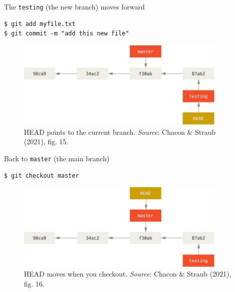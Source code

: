 \documentclass[handout]{beamer}
\begin{document}
\begin{frame}[fragile]{The \texttt{testing} (the new branch) moves forward}

\begin{lstlisting}
$ git add myfile.txt
$ git commit -m "add this new file"
\end{lstlisting}

\begin{figure}
	\includegraphics[width=0.9\textwidth]{figures/fig15_testing_forward.png}
	\caption{HEAD points to the current branch. \textit{Source}: Chacon \& Straub (2021), fig. 15.}
\end{figure}
\end{frame}


\begin{frame}[fragile]{Back to \texttt{master} (the main branch)}

\begin{lstlisting}
$ git checkout master
\end{lstlisting}

\begin{figure}
	\includegraphics[width=0.9\textwidth]{figures/fig16_back_to_master.png}
	\caption{HEAD moves when you checkout. \textit{Source}: Chacon \& Straub (2021), fig. 16.}
\end{figure}
\end{frame}
\end{document}
